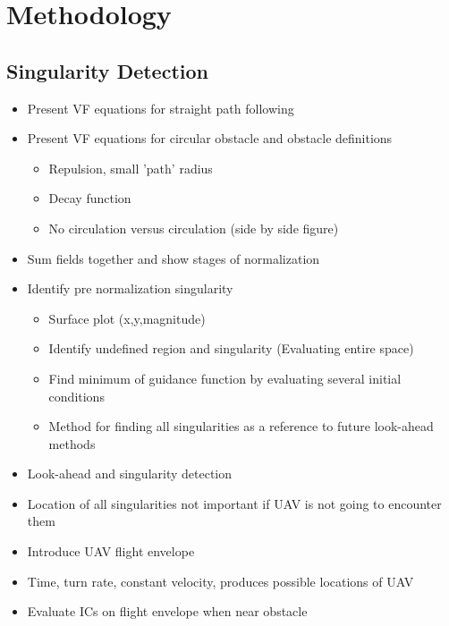 \documentclass[conf]{new-aiaa}
\begin{document}
\section{Methodology}
\subsection{Singularity Detection}
\begin{itemize}
	\item Present VF equations for straight path following
	\item Present VF equations for circular obstacle and obstacle definitions
	\begin{itemize}
		\item Repulsion, small 'path' radius
		\item Decay function
		\item No circulation versus circulation (side by side figure)
	\end{itemize}

	\item Sum fields together and show stages of normalization
	\item Identify pre normalization singularity
	\begin{itemize}
		\item Surface plot (x,y,magnitude)
		\item Identify undefined region and singularity (Evaluating entire space)
		\item Find minimum of guidance function by evaluating several initial conditions
		\item Method for finding all singularities as a reference to future look-ahead methods
	\end{itemize}


	\item Look-ahead and singularity detection
	\item Location of all singularities not important if UAV is not going to encounter them
	\item Introduce UAV flight envelope
	\item Time, turn rate, constant velocity, produces possible locations of UAV
	\item Evaluate ICs on flight envelope when near obstacle
\end{itemize}
\end{document}
